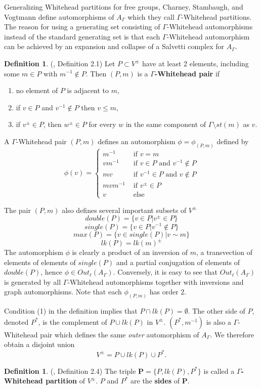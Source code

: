\documentclass[11pt]{amsart}
\numberwithin{thm}{section}
\theoremstyle{remark}
\theoremstyle{definition}
\newtheorem{definition}[thm]{Definition}
\begin{document}
Generalizing Whitehead partitions for free groups, Charney, Stambaugh, and Vogtmann define automorphisms of $A_\Gamma$ which they call $\Gamma$-Whitehead partitions.  The reason for using a generating set consisting of $\Gamma$-Whitehead automorphisms instead of the standard generating set is that each $\Gamma$-Whitehead automorphism can be achieved by an expansion and collapse of a Salvetti complex for $A_\Gamma$.
\begin{definition}(\cite{CSV12}, Definition 2.1) Let $P\subset V^{\pm}$ have at least 2 elements, including some $m\in P$ with $m^{-1}\notin P$.  Then $(P,m)$ is a \textbf{$\Gamma$-Whitehead pair} if\begin{enumerate}
\item no element of $P$ is adjacent to $m$,
\item if $v\in P$ and $v^{-1}\notin P$ then  $v\leq m$,
\item if $v^{\pm}\in P$, then $w^{\pm}\in P$ for every $w$ in the same component of $\Gamma\setminus st(m)$ as $v$.
\end{enumerate}
\end{definition}

A $\Gamma$-Whitehead pair $(P,m)$ defines an automorphism $\phi=\phi_{(P,m)}$ defined by
\[\phi(v)=\left\{\begin{array}{ll}m^{-1}&\mbox{ if $v=m$}\\
vm^{-1} & \mbox{ if $v\in P$ and $v^{-1}\notin P$}\\
mv & \mbox{ if $v^{-1}\in P$ and $v\notin P$}\\
mvm^{-1} & \mbox{ if $v^{\pm}\in P$}\\
v & \mbox{ else}
\end{array}\right.\]

The pair $(P,m)$ also defines several important subsets of $V^{\pm}$\[double(P)=\{v\in P|v^{\pm}\in P\}\]\[single(P)=\{v\in P|v^{-1}\notin P\}\]\[max(P)=\{v\in single(P)|v\sim m\}\]\[lk(P)=lk(m)^{\pm}\]
The automorphism $\phi$ is clearly a product of an inversion of $m$, a transvection of elements of elements of $single(P)$ and a partial conjugation of elements of $double(P)$, hence $\phi\in Out_{\ell}(A_\Gamma)$.  Conversely, it is easy to see that $Out_{\ell}(A_\Gamma)$ is generated by all $\Gamma$-Whitehead automorphisms together with inversions and graph automorphisms.  Note that each $\phi_{(P,m)}$ has order 2.   

Condition (1) in the definition implies that $P\cap lk(P)=\emptyset$.  The other side of $P$, denoted $P^*$, is the complement of $P\cup lk(P)$ in $V^{\pm}$. $(P^*,m^{-1})$ is also a $\Gamma$-Whitehead pair which defines the same \emph{outer} automorphism of $A_\Gamma$.  We therefore obtain a disjoint union \[V^{\pm}=P\cup lk(P)\cup P^*.\]
\begin{definition} (\cite{CSV12}, Definition 2.4) The triple $\textbf{P}=\{P,lk(P), P^*\} $ is called a \textbf{$\Gamma$-Whitehead partition} of $V^{\pm}$.  $P$ and $P^*$ are the \textbf{sides} of \textbf{P}.
\end{definition}
\end{document}
